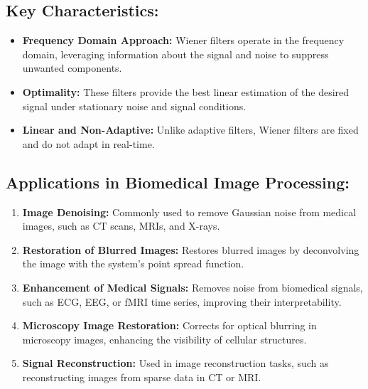\documentclass[hidelinks,12pt]{article}
\begin{document}
	\subsection*{Key Characteristics:}
	\begin{itemize}
		\item \textbf{Frequency Domain Approach:} Wiener filters operate in the frequency domain, leveraging information about the signal and noise to suppress unwanted components.
		\item \textbf{Optimality:} These filters provide the best linear estimation of the desired signal under stationary noise and signal conditions.
		\item \textbf{Linear and Non-Adaptive:} Unlike adaptive filters, Wiener filters are fixed and do not adapt in real-time.
	\end{itemize}
	
	\subsection*{Applications in Biomedical Image Processing:}
	\begin{enumerate}
		\item \textbf{Image Denoising:} Commonly used to remove Gaussian noise from medical images, such as CT scans, MRIs, and X-rays.
		\item \textbf{Restoration of Blurred Images:} Restores blurred images by deconvolving the image with the system's point spread function.
		\item \textbf{Enhancement of Medical Signals:} Removes noise from biomedical signals, such as ECG, EEG, or fMRI time series, improving their interpretability.
		\item \textbf{Microscopy Image Restoration:} Corrects for optical blurring in microscopy images, enhancing the visibility of cellular structures.
		\item \textbf{Signal Reconstruction:} Used in image reconstruction tasks, such as reconstructing images from sparse data in CT or MRI.
	\end{enumerate}
	
\end{document}
